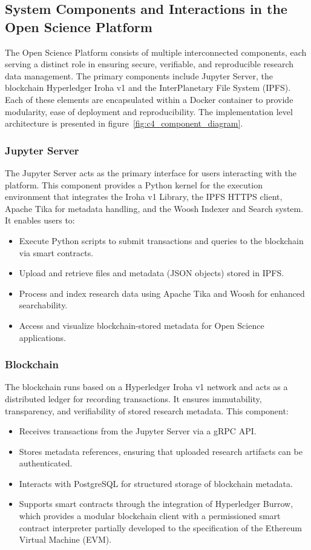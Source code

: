 \documentclass{article}
\begin{document}
\subsection{System Components and Interactions in the Open Science Platform}

The Open Science Platform consists of multiple interconnected components, each serving a distinct role in ensuring secure, verifiable, and reproducible research data management. The primary components include Jupyter Server, the blockchain Hyperledger Iroha v1 and the InterPlanetary File System (IPFS). Each of these elements are encapsulated within a Docker container to provide modularity, ease of deployment and reproducibility. The implementation level architecture is presented in figure~\ref{fig:c4_component_diagram}.

\subsubsection{Jupyter Server}
The Jupyter Server acts as the primary interface for users interacting with the platform. This component provides a Python kernel for the execution environment that integrates the Iroha v1 Library, the IPFS HTTPS client, Apache Tika for metadata handling, and the Woosh Indexer and Search system. It enables users to:

\begin{itemize}
      \item Execute Python scripts to submit transactions and queries to the blockchain via smart contracts.
      \item Upload and retrieve files and metadata (JSON objects) stored in IPFS.
      \item Process and index research data using Apache Tika and Woosh for enhanced searchability.
      \item Access and visualize blockchain-stored metadata for Open Science applications.
\end{itemize}

\subsubsection{Blockchain}
The blockchain runs based on a Hyperledger Iroha v1 network and acts as a distributed ledger for recording transactions. It ensures immutability, transparency, and verifiability of stored research metadata. This component:
\begin{itemize}
      \item Receives transactions from the Jupyter Server via a gRPC API.
      \item Stores metadata references, ensuring that uploaded research artifacts can be authenticated.
      \item Interacts with PostgreSQL for structured storage of blockchain metadata.
      \item Supports smart contracts through the integration of Hyperledger Burrow, which provides a modular blockchain client with a permissioned smart contract interpreter partially developed to the specification of the Ethereum Virtual Machine (EVM).

\end{itemize}
\end{document}
